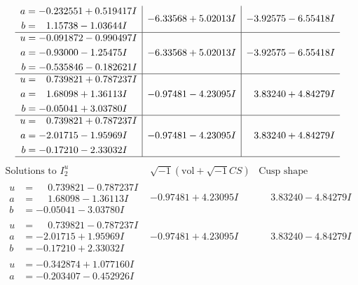 \documentclass[1p]{elsarticle_modified}
\theoremstyle{definition}
\newcommand{\I}{\sqrt{-1}}
\begin{document}
$$\begin{array}{c|c|c}
\begin{aligned}
a &= -0.232551 + 0.519417 I \\
b &= \phantom{-}1.15738 - 1.03644 I\end{aligned}
 & -6.33568 + 5.02013 I & -3.92575 - 6.55418 I \\ \hline\begin{aligned}
u &= -0.091872 - 0.990497 I \\
a &= -0.93000 - 1.25475 I \\
b &= -0.535846 - 0.182621 I\end{aligned}
 & -6.33568 + 5.02013 I & -3.92575 - 6.55418 I \\ \hline\begin{aligned}
u &= \phantom{-}0.739821 + 0.787237 I \\
a &= \phantom{-}1.68098 + 1.36113 I \\
b &= -0.05041 + 3.03780 I\end{aligned}
 & -0.97481 - 4.23095 I & \phantom{-}3.83240 + 4.84279 I \\ \hline\begin{aligned}
u &= \phantom{-}0.739821 + 0.787237 I \\
a &= -2.01715 - 1.95969 I \\
b &= -0.17210 - 2.33032 I\end{aligned}
 & -0.97481 - 4.23095 I & \phantom{-}3.83240 + 4.84279 I\\
 \hline 
 \end{array}$$\newpage$$\begin{array}{c|c|c}  
\text{Solutions to }I^u_{2}& \I (\text{vol} + \sqrt{-1}CS) & \text{Cusp shape}\\
 \hline 
\begin{aligned}
u &= \phantom{-}0.739821 - 0.787237 I \\
a &= \phantom{-}1.68098 - 1.36113 I \\
b &= -0.05041 - 3.03780 I\end{aligned}
 & -0.97481 + 4.23095 I & \phantom{-}3.83240 - 4.84279 I \\ \hline\begin{aligned}
u &= \phantom{-}0.739821 - 0.787237 I \\
a &= -2.01715 + 1.95969 I \\
b &= -0.17210 + 2.33032 I\end{aligned}
 & -0.97481 + 4.23095 I & \phantom{-}3.83240 - 4.84279 I \\ \hline\begin{aligned}
u &= -0.342874 + 1.077160 I \\
a &= -0.203407 - 0.452926 I \\

\end{aligned}
\end{array}$$
\end{document}
